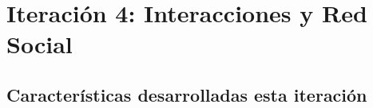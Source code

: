 \chapter{Iteración 4: Interacciones y Red Social}

\begin{abstract}
Esta iteración convierte Scubex en una red social de buceo. Se añaden likes, guardados y comentarios con menciones en las publicaciones, la posibilidad de seguir a otros buceadores con perfiles públicos, y un centro de notificaciones que informa al usuario de toda actividad relacionada con su contenido.\end{abstract}

\section{Características desarrolladas esta iteración}

